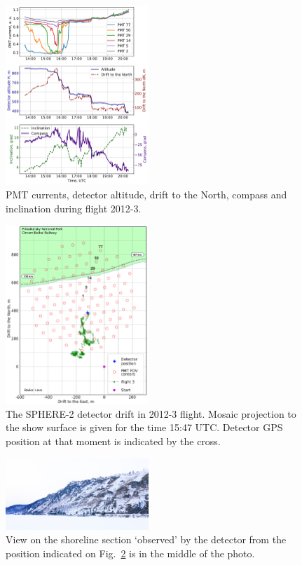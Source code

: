 \documentclass[preprint,5p,times]{elsarticle}
\begin{document}
\begin{figure}[tb]
    \includegraphics[width=0.48\textwidth]{2012-3_currents_H_dN.pdf}
    \caption{PMT currents, detector altitude, drift to the North, compass and inclination during flight 2012-3.}
    \label{fig:2012-3_currents}
\end{figure}

\begin{figure}[tb]
    \includegraphics[width=0.48\textwidth]{2012_drift-mod.pdf}
    \caption{The SPHERE-2 detector drift in 2012-3 flight. Mosaic projection to the show surface is given for the time 15:47 UTC. Detector GPS position at that moment is indicated by the cross.}
    \label{fig:2012-drift}
\end{figure}

\begin{figure}[tb]
    \includegraphics[width=0.48\textwidth]{DSC_7256_1.jpg}
    \caption{View on the shoreline section `observed' by the detector from the position indicated on Fig.~\ref{fig:2012-drift} is in the middle of the photo.}
    \label{fig:2012--shore-view}
\end{figure}
\end{document}

